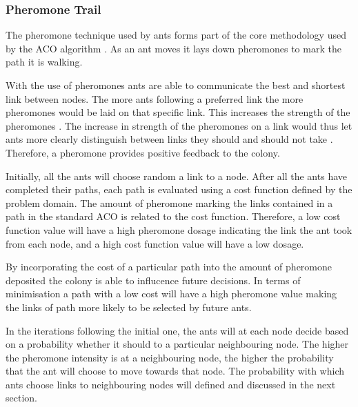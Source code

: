 \subsubsection{Pheromone Trail}
\label{sec:pheromonetrail}
The pheromone technique used by ants forms part of the core methodology used by the ACO algorithm \cite{AntQAP}. As an ant moves it lays down pheromones to mark the path it is walking.

With the use of pheromones ants are able to communicate the best and shortest link between nodes\cite{AntQAP,AntsAndStigmergy,CompuIntelligenceIntro}. The more ants following a preferred link the more pheromones would be laid on that specific link. This increases the strength of the pheromones \cite{ImpACOComplex}. The increase in strength of the pheromones on a link would thus let ants more clearly distinguish between links they should and should not take \cite{ImpACOComplex}. Therefore, a pheromone provides positive feedback to the colony\cite{AntQAP,AntsAndStigmergy,CompuIntelligenceIntro}.

Initially, all the ants will choose random a link to a node\cite{AntQAP,AntsAndStigmergy,CompuIntelligenceIntro}. After all the ants have completed their paths, each path is evaluated using a cost function defined by the problem domain\cite{CompuIntelligenceIntro}. The amount of pheromone marking the links contained in a path in the standard ACO is related to the cost function\cite{AntQAP,AntsAndStigmergy,CompuIntelligenceIntro}. Therefore, a low cost function value will have a high pheromone dosage indicating the link the ant took from each node, and a high cost function value will have a low dosage\cite{CompuIntelligenceIntro}. 


By incorporating the cost of a particular path into the amount of pheromone deposited the colony is able to influcence future decisions\cite{CompuIntelligenceIntro}. In terms of minimisation a path with a low cost will have a high pheromone value making the links of path more likely to be selected by future ants\cite{CompuIntelligenceIntro}.

In the iterations following the initial one, the ants will at each node decide based on a probability whether it should to a particular neighbouring node. The higher the pheromone intensity is at a neighbouring node, the higher the probability that the ant will choose to move towards that node\cite{AntQAP,AntsAndStigmergy,CompuIntelligenceIntro}. The probability with which ants choose links to neighbouring nodes will defined and discussed in the next section.


